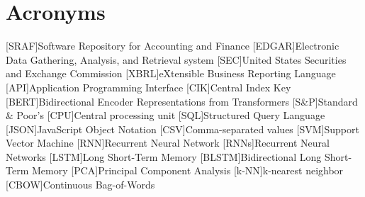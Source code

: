 \chapter*{Acronyms}
\begin{acronym}[EDGAR]
    [SRAF]{Software Repository for Accounting and Finance}
    [EDGAR]{Electronic Data Gathering, Analysis, and Retrieval system}
    [SEC]{United States Securities and Exchange Commission}
    [XBRL]{eXtensible Business Reporting Language}
    [API]{Application Programming Interface}
    [CIK]{Central Index Key}
    [BERT]{Bidirectional Encoder Representations from Transformers}
    [S\&P]{Standard \& Poor’s}
    [CPU]{Central processing unit}
    [SQL]{Structured Query Language}
    [JSON]{JavaScript Object Notation}
    [CSV]{Comma-separated values}
    [SVM]{Support Vector Machine}
    [RNN]{Recurrent Neural Network}
    [RNNs]{Recurrent Neural Networks}
    [LSTM]{Long Short-Term Memory}
    [BLSTM]{Bidirectional Long Short-Term Memory}
    [PCA]{Principal Component Analysis}
    [k-NN]{k-nearest neighbor}
    [CBOW]{Continuous Bag-of-Words}
\end{acronym}